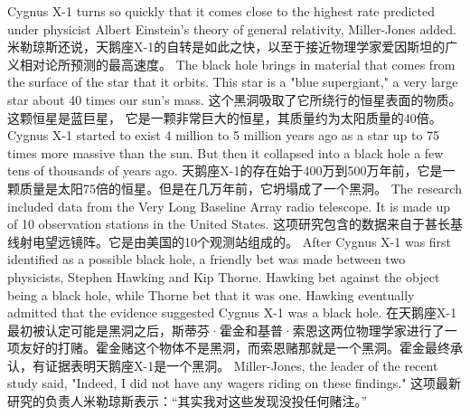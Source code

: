 Cygnus X-1 turns so quickly that it comes close to the highest rate predicted under physicist Albert Einstein's theory of general relativity, Miller-Jones added.
米勒琼斯还说，天鹅座X-1的自转是如此之快，以至于接近物理学家爱因斯坦的广义相对论所预测的最高速度。
The black hole brings in material that comes from the surface of the star that it orbits. This star is a "blue supergiant," a very large star about 40 times our sun's mass.
这个黑洞吸取了它所绕行的恒星表面的物质。这颗恒星是蓝巨星， 它是一颗非常巨大的恒星，其质量约为太阳质量的40倍。
Cygnus X-1 started to exist 4 million to 5 million years ago as a star up to 75 times more massive than the sun. But then it collapsed into a black hole a few tens of thousands of years ago.
天鹅座X-1的存在始于400万到500万年前，它是一颗质量是太阳75倍的恒星。但是在几万年前，它坍塌成了一个黑洞。
The research included data from the Very Long Baseline Array radio telescope. It is made up of 10 observation stations in the United States.
这项研究包含的数据来自于甚长基线射电望远镜阵。它是由美国的10个观测站组成的。
After Cygnus X-1 was first identified as a possible black hole, a friendly bet was made between two physicists, Stephen Hawking and Kip Thorne. Hawking bet against the object being a black hole, while Thorne bet that it was one. Hawking eventually admitted that the evidence suggested Cygnus X-1 was a black hole.
在天鹅座X-1最初被认定可能是黑洞之后，斯蒂芬·霍金和基普·索恩这两位物理学家进行了一项友好的打赌。霍金赌这个物体不是黑洞，而索恩赌那就是一个黑洞。霍金最终承认，有证据表明天鹅座X-1是一个黑洞。
Miller-Jones, the leader of the recent study said, "Indeed, I did not have any wagers riding on these findings."
这项最新研究的负责人米勒琼斯表示：“其实我对这些发现没投任何赌注。”

